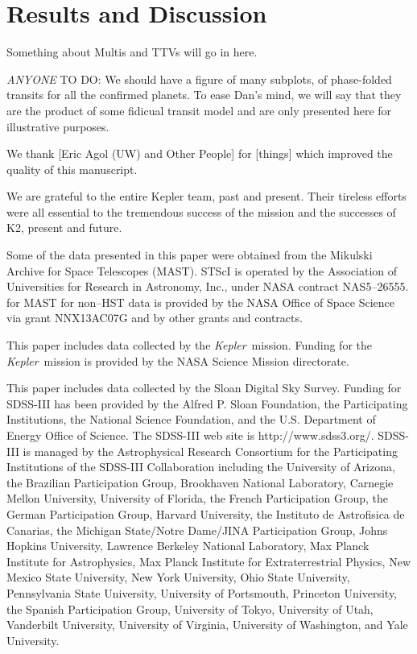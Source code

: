 \documentclass{emulateapj}
\newcommand{\project}[1]{\textsl{#1}}
\newcommand{\kep}{\project{Kepler}}
\newcommand{\todo}[3]{{\color{#2} \emph{#1} TO DO: #3}}
\newcommand{\anytodo}[1]{\todo{ANYONE}{NavyBlue}{#1}}
\begin{document}
\section{Results and Discussion}

Something about Multis and TTVs will go in here.

\anytodo{We should have a figure of many subplots, of phase-folded
transits for all the confirmed planets. 
To ease Dan's mind, we will say that they are the product of 
some fidicual transit model and are only presented here for illustrative
purposes.}


\acknowledgements
We thank [Eric Agol (UW) and Other People] for [things] which improved the quality of this manuscript.


We are grateful to the entire Kepler team, past and present. 
Their tireless efforts were all essential to the tremendous success of the mission and the successes of K2, present and future.


Some of the data presented in this paper were obtained from the Mikulski
Archive for Space Telescopes (MAST). 
STScI is operated by the Association of Universities for Research 
in Astronomy, Inc., under NASA contract NAS5--26555. 
for MAST for non--HST data is provided by the NASA Office of Space 
Science via grant NNX13AC07G and by other grants and contracts. 

This paper includes data collected by the \kep\ mission. 
Funding for the \kep\ mission is provided by the NASA Science 
Mission directorate.

This paper includes data collected by the Sloan Digital Sky Survey.
Funding for SDSS-III has been provided by the Alfred P. Sloan Foundation,
the Participating Institutions, the National Science Foundation, and the
U.S. Department of Energy Office of Science. The SDSS-III web site is
http://www.sdss3.org/.
SDSS-III is managed by the Astrophysical Research Consortium for the
Participating Institutions of the SDSS-III Collaboration including the
University of Arizona, the Brazilian Participation Group, Brookhaven
National Laboratory, Carnegie Mellon University, University of Florida,
the French Participation Group, the German Participation Group, Harvard
University, the Instituto de Astrofisica de Canarias, the Michigan
State/Notre Dame/JINA Participation Group, Johns Hopkins University,
Lawrence Berkeley National Laboratory, Max Planck Institute for
Astrophysics, Max Planck Institute for Extraterrestrial Physics, New
Mexico State University, New York University, Ohio State University,
Pennsylvania State University, University of Portsmouth, Princeton
University, the Spanish Participation Group, University of Tokyo,
University of Utah, Vanderbilt University, University of Virginia,
University of Washington, and Yale University.
\end{document}
